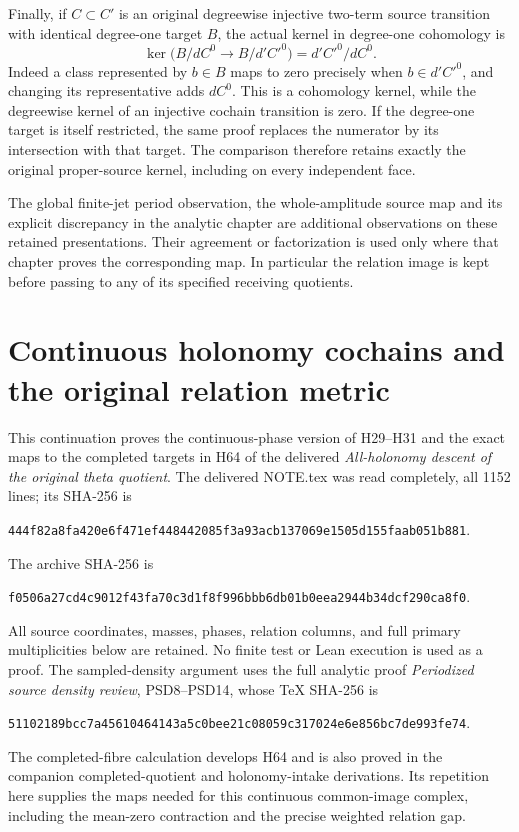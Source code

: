 \documentclass[11pt,a4paper]{article}
\theoremstyle{definition}
\providecommand{\im}{\operatorname{im}}
\providecommand{\C}{\mathbb C}
\providecommand{\R}{\mathbb R}
\begin{document}
Finally, if \(C\subset C'\) is an original degreewise injective
two-term source transition with identical degree-one target \(B\),
the actual kernel in degree-one cohomology is
\[
 \ker\bigl(B/dC^0\longrightarrow B/d'C'^0\bigr)
            =d'C'^0/dC^0 .
 \tag{IMS8}
\]
Indeed a class represented by \(b\in B\) maps to zero precisely
when \(b\in d'C'^0\), and changing its representative adds
\(dC^0\).  This is a cohomology kernel, while the degreewise kernel
of an injective cochain transition is zero.  If the degree-one
target is itself restricted, the same proof replaces the numerator
by its intersection with that target.  The comparison therefore
retains exactly the original proper-source kernel, including on
every independent face.

The global finite-jet period observation, the whole-amplitude source
map and its explicit discrepancy in the analytic chapter are
additional observations on these retained presentations.  Their
agreement or factorization is used only where that chapter proves
the corresponding map.  In particular the relation image is kept
before passing to any of its specified receiving quotients.



\begingroup
\def\C{\mathbb C}
\def\R{\mathbb R}
\def\av{\operatorname{av}}
\def\im{\operatorname{im}}
\section{Continuous holonomy cochains and the original relation metric}



This continuation proves the continuous-phase version of H29--H31
and the exact maps to the completed targets in H64 of the delivered
\emph{All-holonomy descent of the original theta quotient}.
The delivered NOTE.tex was read completely, all 1152 lines;
its SHA-256 is
\begin{center}\small
\texttt{444f82a8fa420e6f471ef448442085f3a93acb137069e1505d155faab051b881}.
\end{center}
The archive SHA-256 is
\begin{center}\small
\texttt{f0506a27cd4c9012f43fa70c3d1f8f996bbb6db01b0eea2944b34dcf290ca8f0}.
\end{center}
All source coordinates, masses, phases, relation columns, and full
primary multiplicities below are retained. No finite test or Lean
execution is used as a proof.
The sampled-density argument uses the full analytic proof
\emph{Periodized source density review}, PSD8--PSD14,
whose TeX SHA-256 is
\begin{center}\small
\texttt{51102189bcc7a45610464143a5c0bee21c08059c317024e6e856bc7de993fe74}.
\end{center}
The completed-fibre calculation develops H64 and is also proved
in the companion completed-quotient and holonomy-intake derivations.
Its repetition here supplies the maps needed for this continuous
common-image complex, including the mean-zero contraction and
the precise weighted relation gap.
\end{document}
